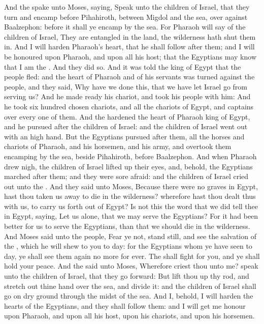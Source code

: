 \begin{biblechapter} %
\verse And the \LORD spake unto Moses, saying,
\verse Speak unto the children of Israel, that they turn and encamp before Pihahiroth, between Migdol and the sea, over against Baalzephon: before it shall ye encamp by the sea.
\verse For Pharaoh will say of the children of Israel, They are entangled in the land, the wilderness hath shut them in.
\verse And I will harden Pharaoh's heart, that he shall follow after them; and I will be honoured upon Pharaoh, and upon all his host; that the Egyptians may know that I am the \LORD. And they did so.
\verse And it was told the king of Egypt that the people fled: and the heart of Pharaoh and of his servants was turned against the people, and they said, Why have we done this, that we have let Israel go from serving us?
\verse And he made ready his chariot, and took his people with him:
\verse And he took six hundred chosen chariots, and all the chariots of Egypt, and captains over every one of them.
\verse And the \LORD hardened the heart of Pharaoh king of Egypt, and he pursued after the children of Israel: and the children of Israel went out with an high hand.
\verse But the Egyptians pursued after them, all the horses and chariots of Pharaoh, and his horsemen, and his army, and overtook them encamping by the sea, beside Pihahiroth, before Baalzephon.
\verse And when Pharaoh drew nigh, the children of Israel lifted up their eyes, and, behold, the Egyptians marched after them; and they were sore afraid: and the children of Israel cried out unto the \LORD.
\verse And they said unto Moses, Because there were no graves in Egypt, hast thou taken us away to die in the wilderness? wherefore hast thou dealt thus with us, to carry us forth out of Egypt?
\verse Is not this the word that we did tell thee in Egypt, saying, Let us alone, that we may serve the Egyptians? For it had been better for us to serve the Egyptians, than that we should die in the wilderness.
\verse And Moses said unto the people, Fear ye not, stand still, and see the salvation of the \LORD, which he will shew to you to day: for the Egyptians whom ye have seen to day, ye shall see them again no more for ever.
\verse The \LORD shall fight for you, and ye shall hold your peace.
\verse And the \LORD said unto Moses, Wherefore criest thou unto me? speak unto the children of Israel, that they go forward:
\verse But lift thou up thy rod, and stretch out thine hand over the sea, and divide it: and the children of Israel shall go on dry ground through the midst of the sea.
\verse And I, behold, I will harden the hearts of the Egyptians, and they shall follow them: and I will get me honour upon Pharaoh, and upon all his host, upon his chariots, and upon his horsemen.

\end{biblechapter}
